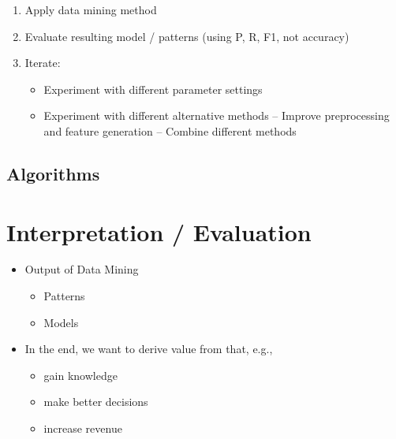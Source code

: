 \begin{enumerate}
	\item Apply data mining method
	\item Evaluate resulting model / patterns (using P, R, F1, not accuracy)
	\item Iterate:
	\begin{itemize}
		\item Experiment with different parameter settings
		\item Experiment with different alternative methods – Improve preprocessing and feature generation – Combine different methods
	\end{itemize}
\end{enumerate}

\section{Algorithms}



\chapter{Interpretation / Evaluation}
\label{cha:interpretation_evaluation}
\begin{itemize}
	\item Output of Data Mining
	\begin{itemize}
		\item Patterns
		\item Models
	\end{itemize}
	\item In the end, we want to derive value from that, e.g.,
	\begin{itemize}
		\item gain knowledge
		\item make better decisions
		\item increase revenue
	\end{itemize}
\end{itemize}



